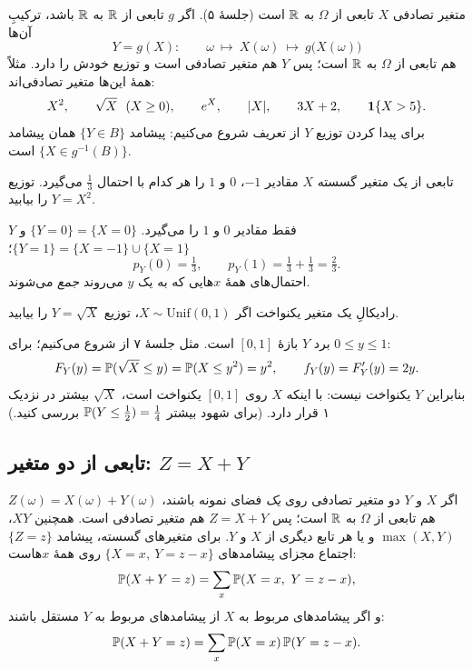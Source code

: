 متغیر تصادفی $X$ تابعی از $\Omega$ به $\R$ است (جلسهٔ ۵). اگر $g$ تابعی از $\R$ به $\R$ باشد، ترکیبِ آن‌ها
\[ Y=g(X):\qquad \omega\ \longmapsto\ X(\omega)\ \longmapsto\ g\bigl(X(\omega)\bigr) \]
هم تابعی از $\Omega$ به $\R$ است؛ پس $Y$ هم متغیر تصادفی است و توزیع خودش را دارد. مثلاً همهٔ این‌ها متغیر تصادفی‌اند:
\[ X^2,\qquad \sqrt X\ \ (X\ge0),\qquad e^X,\qquad |X|,\qquad 3X+2,\qquad \ind\{X>5\}. \]
برای پیدا کردن توزیع $Y$ از تعریف شروع می‌کنیم: پیشامد $\{Y\in B\}$ همان پیشامد $\{X\in g^{-1}(B)\}$ است.

\begin{example}[label=ex:func-disc]{تابعی از یک متغیر گسسته}
  $X$ مقادیر $-1$، $0$ و $1$ را هر کدام با احتمال $\tfrac13$ می‌گیرد. توزیع $Y=X^2$ را بیابید.
  \begin{solution}
    $Y$ فقط مقادیر $0$ و $1$ را می‌گیرد. $\{Y=0\}=\{X=0\}$ و $\{Y=1\}=\{X=-1\}\cup\{X=1\}$؛
    \[ p_Y(0)=\tfrac13,\qquad p_Y(1)=\tfrac13+\tfrac13=\tfrac23. \]
    احتمال‌های همهٔ $x$هایی که به یک $y$ می‌روند \emph{جمع} می‌شوند.
  \end{solution}
\end{example}

\begin{example}[label=ex:sqrt]{رادیکالِ یک متغیر یکنواخت}
  اگر $X\sim\mathrm{Unif}(0,1)$، توزیع $Y=\sqrt X$ را بیابید.
  \begin{solution}
    برد $Y$ بازهٔ $[0,1]$ است. مثل جلسهٔ ۷ از  شروع می‌کنیم؛ برای $0\le y\le1$:
    \[ F_Y(y)=\P(\sqrt X\le y)=\P(X\le y^2)=y^2,\qquad f_Y(y)=F_Y'(y)=2y. \]
    بنابراین $Y$ یکنواخت نیست: با اینکه $X$ روی $[0,1]$ یکنواخت است، $\sqrt X$ بیشتر در نزدیک ۱ قرار دارد. (برای شهود بیشتر  $\P(Y\le\tfrac12)=\tfrac14$ بررسی کنید.)
  \end{solution}
\end{example}

\subsection{تابعی از دو متغیر: $Z=X+Y$}

اگر $X$ و $Y$ دو متغیر تصادفی روی \emph{یک} فضای نمونه باشند، $Z(\omega)=X(\omega)+Y(\omega)$ هم تابعی از $\Omega$ به $\R$ است؛ پس $Z=X+Y$ هم متغیر تصادفی است. همچنین $XY$، $\max(X,Y)$ و یا هر تابع دیگری از $X$ و $Y$. برای متغیرهای گسسته، پیشامد $\{Z=z\}$ اجتماع مجزای پیشامدهای $\{X=x,\ Y=z-x\}$ روی همهٔ $x$هاست:
\[ \P(X+Y=z)=\sum_x\P(X=x,\ Y=z-x), \]
و اگر پیشامدهای مربوط به $X$ از پیشامدهای مربوط به $Y$ مستقل باشند:
\[ \P(X+Y=z)=\sum_x\P(X=x)\,\P(Y=z-x). \]

